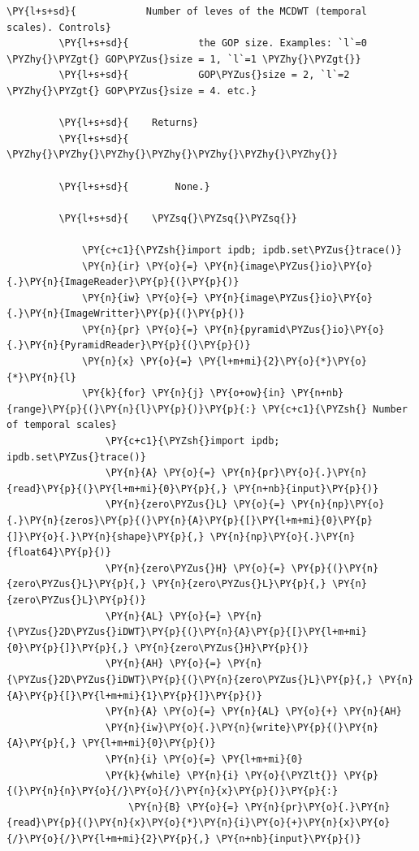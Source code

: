 \begin{Verbatim}[commandchars=\\\{\}]
         \PY{l+s+sd}{            Number of leves of the MCDWT (temporal scales). Controls}
         \PY{l+s+sd}{            the GOP size. Examples: `l`=0 \PYZhy{}\PYZgt{} GOP\PYZus{}size = 1, `l`=1 \PYZhy{}\PYZgt{}}
         \PY{l+s+sd}{            GOP\PYZus{}size = 2, `l`=2 \PYZhy{}\PYZgt{} GOP\PYZus{}size = 4. etc.}
         
         \PY{l+s+sd}{    Returns}
         \PY{l+s+sd}{    \PYZhy{}\PYZhy{}\PYZhy{}\PYZhy{}\PYZhy{}\PYZhy{}\PYZhy{}}
         
         \PY{l+s+sd}{        None.}
         
         \PY{l+s+sd}{    \PYZsq{}\PYZsq{}\PYZsq{}}
             
             \PY{c+c1}{\PYZsh{}import ipdb; ipdb.set\PYZus{}trace()}
             \PY{n}{ir} \PY{o}{=} \PY{n}{image\PYZus{}io}\PY{o}{.}\PY{n}{ImageReader}\PY{p}{(}\PY{p}{)}
             \PY{n}{iw} \PY{o}{=} \PY{n}{image\PYZus{}io}\PY{o}{.}\PY{n}{ImageWritter}\PY{p}{(}\PY{p}{)}
             \PY{n}{pr} \PY{o}{=} \PY{n}{pyramid\PYZus{}io}\PY{o}{.}\PY{n}{PyramidReader}\PY{p}{(}\PY{p}{)}
             \PY{n}{x} \PY{o}{=} \PY{l+m+mi}{2}\PY{o}{*}\PY{o}{*}\PY{n}{l}
             \PY{k}{for} \PY{n}{j} \PY{o+ow}{in} \PY{n+nb}{range}\PY{p}{(}\PY{n}{l}\PY{p}{)}\PY{p}{:} \PY{c+c1}{\PYZsh{} Number of temporal scales}
                 \PY{c+c1}{\PYZsh{}import ipdb; ipdb.set\PYZus{}trace()}
                 \PY{n}{A} \PY{o}{=} \PY{n}{pr}\PY{o}{.}\PY{n}{read}\PY{p}{(}\PY{l+m+mi}{0}\PY{p}{,} \PY{n+nb}{input}\PY{p}{)}
                 \PY{n}{zero\PYZus{}L} \PY{o}{=} \PY{n}{np}\PY{o}{.}\PY{n}{zeros}\PY{p}{(}\PY{n}{A}\PY{p}{[}\PY{l+m+mi}{0}\PY{p}{]}\PY{o}{.}\PY{n}{shape}\PY{p}{,} \PY{n}{np}\PY{o}{.}\PY{n}{float64}\PY{p}{)}
                 \PY{n}{zero\PYZus{}H} \PY{o}{=} \PY{p}{(}\PY{n}{zero\PYZus{}L}\PY{p}{,} \PY{n}{zero\PYZus{}L}\PY{p}{,} \PY{n}{zero\PYZus{}L}\PY{p}{)}
                 \PY{n}{AL} \PY{o}{=} \PY{n}{\PYZus{}2D\PYZus{}iDWT}\PY{p}{(}\PY{n}{A}\PY{p}{[}\PY{l+m+mi}{0}\PY{p}{]}\PY{p}{,} \PY{n}{zero\PYZus{}H}\PY{p}{)}
                 \PY{n}{AH} \PY{o}{=} \PY{n}{\PYZus{}2D\PYZus{}iDWT}\PY{p}{(}\PY{n}{zero\PYZus{}L}\PY{p}{,} \PY{n}{A}\PY{p}{[}\PY{l+m+mi}{1}\PY{p}{]}\PY{p}{)}
                 \PY{n}{A} \PY{o}{=} \PY{n}{AL} \PY{o}{+} \PY{n}{AH}
                 \PY{n}{iw}\PY{o}{.}\PY{n}{write}\PY{p}{(}\PY{n}{A}\PY{p}{,} \PY{l+m+mi}{0}\PY{p}{)}
                 \PY{n}{i} \PY{o}{=} \PY{l+m+mi}{0}
                 \PY{k}{while} \PY{n}{i} \PY{o}{\PYZlt{}} \PY{p}{(}\PY{n}{n}\PY{o}{/}\PY{o}{/}\PY{n}{x}\PY{p}{)}\PY{p}{:}
                     \PY{n}{B} \PY{o}{=} \PY{n}{pr}\PY{o}{.}\PY{n}{read}\PY{p}{(}\PY{n}{x}\PY{o}{*}\PY{n}{i}\PY{o}{+}\PY{n}{x}\PY{o}{/}\PY{o}{/}\PY{l+m+mi}{2}\PY{p}{,} \PY{n+nb}{input}\PY{p}{)}

\end{Verbatim}
